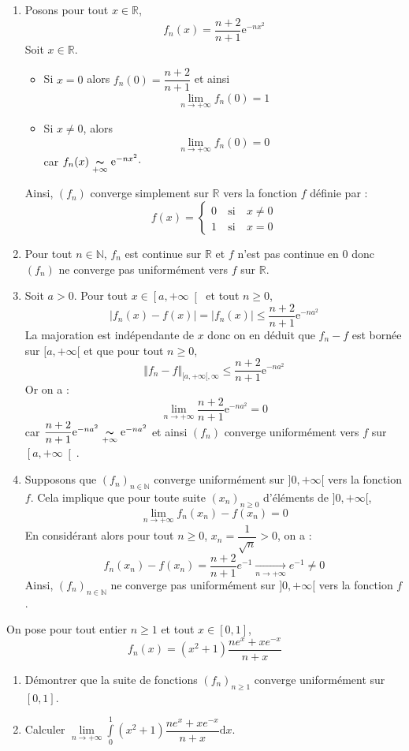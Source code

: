 \documentclass[a4paper,10pt]{report}
\begin{document}
\corr \begin{enumerate}
\item Posons pour tout $ x\in\mathbb{R}$, 
$$f_{n}(x) =\dfrac{n+2}{n+1}\mathrm{e}^{-n x^{2}}$$
Soit $x\in\mathbb{R}$.
\begin{itemize}
\item Si $x=0$ alors $f_n(0)=\dfrac{n+2}{n+1}$ et ainsi
$$\lim\limits_{n\to+\infty}^{}f_n(0)=1$$
\item Si $x\neq 0$, alors 
$$\lim\limits_{n\to+\infty}^{}f_n(0)=0$$ 
car $f_n(x)\underset{+\infty}{\thicksim}\mathrm{e}^{-nx^2} \cdot$
\end{itemize}
Ainsi, $(f_n)$ converge simplement sur $\mathbb{R}$ vers la fonction $f$ définie par :
 $$f(x)=\left\lbrace \begin{array}{lll}
 0&\:\text{si}\:& x\neq 0\\
 1&\:\text{si}\:& x=0
 \end{array}\right.  $$
\item Pour tout $n \in \mathbb{N}$, $f_n$ est continue sur $\mathbb{R}$ et $f$ n'est pas continue en $0$ donc $(f_n)$ ne converge pas uniformément vers $f$ sur $\mathbb{R}$.
\item  Soit $a>0$. Pour tout $x\in \left[a,+\infty \right[$ et tout $n \geq 0$,
$$|f_n(x)-f(x)|=|f_n(x)|\leq \dfrac{n+2}{n+1}\mathrm{e}^{-n a^{2}}$$
La majoration est indépendante de $x$ donc on en déduit que $f_n-f$ est bornée sur $[a, + \infty[$ et que pour tout $n \geq 0$, 
$$ \Vert f_n - f \Vert_{[a, + \infty[,\infty} \leq \dfrac{n+2}{n+1}\mathrm{e}^{-n a^{2}}$$
Or on a :
$$\lim\limits_{n\to +\infty}^{}\dfrac{n+2}{n+1}\mathrm{e}^{-n a^{2}}=0$$
car $\dfrac{n+2}{n+1}\mathrm{e}^{-n a^{2}}\underset{+\infty}{\thicksim}\mathrm{e}^{-n a^{2}}$ et ainsi $(f_n)$ converge uniformément vers $f$ sur $\left[a,+\infty \right[$.
\item Supposons que $\left(f_{n}\right) _{n\in \mathbb{N}}$ converge uniform\'{e}ment sur $]0,+\infty[$ vers la fonction $f$. Cela implique que pour toute suite $(x_n)_{n \geq 0}$ d'éléments de $]0, + \infty[$,
$$ \lim_{n \rightarrow + \infty} f_n(x_n) - f(x_n) = 0$$
En considérant alors pour tout $n \geq 0$, $x_n = \dfrac{1}{\sqrt{n}}>0$, on a :
$$ f_n(x_n)-f(x_n) = \dfrac{n+2}{n+1} e^{-1} \underset{n \rightarrow + \infty}{\rightarrow} e^{-1} \neq 0$$
Ainsi, $\left(f_{n}\right) _{n\in \mathbb{N}}$ ne converge pas uniform\'{e}ment sur $]0,+\infty[$ vers la fonction $f$.
\end{enumerate}

\begin{Exercice}{}On pose pour tout entier $n \geq 1$ et tout $x \in [0,1]$,
$$f_{n}\left( x\right) =\left( x^{2}+1\right) \dfrac{ne^{x}+xe^{-x}}{n+x} $$

\begin{enumerate}
\item Démontrer que la suite de fonctions $\left( f_{n}\right) _{n \geq 1}$ converge uniform\'{e}ment sur $[0,1]$.
\item Calculer $\underset{n\rightarrow +\infty }{\lim }\displaystyle\int\limits_{0}^{1}\left( x^{2}+1\right) \dfrac{ne^{x}+xe^{-x}}{n+x}\text{d}x$.
\end{enumerate}
\end{Exercice} 
\end{document}
